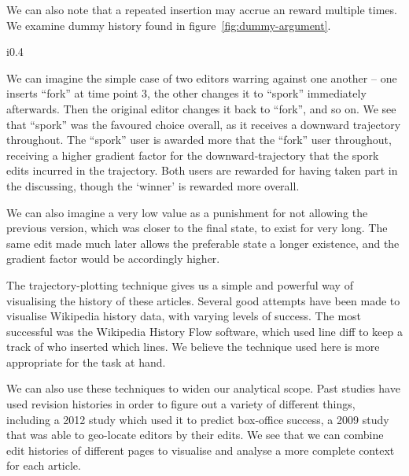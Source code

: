 We can also note that a repeated insertion may accrue an reward
multiple times. We examine dummy history found in
figure~\ref{fig:dummy-argument}.

\begin{wrapfigure}{i}{0.4\textwidth}
  \centering
  \pgfplotsset{width=0.4\textwidth}
  \caption{Graph showing trajectory with repeated actions}
  \label{fig:dummy-argument}
\end{wrapfigure}

We can imagine the simple case of two editors warring against one
another -- one inserts ``fork'' at time point 3, the other changes it
to ``spork'' immediately afterwards. Then the original editor changes
it back to ``fork'', and so on. We see that ``spork'' was the favoured
choice overall, as it receives a downward trajectory throughout. The
``spork'' user is awarded more that the ``fork'' user throughout,
receiving a higher gradient factor for the downward-trajectory that
the spork edits incurred in the trajectory. Both users are rewarded
for having taken part in the discussing, though the `winner' is
rewarded more overall.

We can also imagine a very low value as a punishment for not allowing
the previous version, which was closer to the final state, to exist
for very long. The same edit made much later allows the preferable
state a longer existence, and the gradient factor would be accordingly
higher.

The trajectory-plotting technique gives us a simple and powerful way
of visualising the history of these articles. Several good attempts
have been made to visualise Wikipedia history data, with varying
levels of
success.\cite{Chi2008}\cite{Sabel2007}\cite{Suh2007}\cite{Wu2013}\cite{Viegas2004}
The most successful was the Wikipedia History Flow
software,\cite{iphylo-history}\cite{wiki-history-flow} which used line
diff to keep a track of who inserted which lines. We believe the
technique used here is more appropriate for the task at hand.

We can also use these techniques to widen our analytical scope. Past
studies have used revision histories in order to figure out a variety
of different things, including a 2012 study which used it to predict
box-office success,\cite{Mestyan2012} a 2009 study that was able to
geo-locate editors by their edits.\cite{Lieberman2009} We see that we
can combine edit histories of different pages to visualise and analyse
a more complete context for each article.


